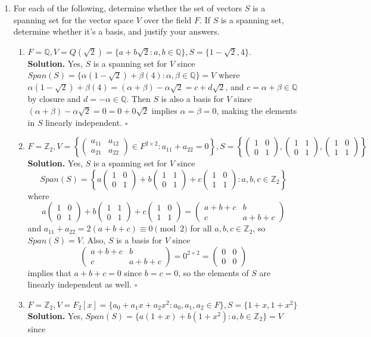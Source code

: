 \documentclass[11pt,twoside]{article}
\newcommand{\Z}{\mathbb{Z}}
\newcommand{\Q}{\mathbb{Q}}
\newcommand{\m}[1]{\begin{pmatrix}#1\end{pmatrix}}
\begin{document}
\begin{enumerate}
    \item For each of the following, determine whether the set of vectors $S$ is a spanning set for the vector space $V$ over the field $F$. If $S$ is a spanning set, determine whether it's a basis, and justify your answers.
          \begin{enumerate}
              \item $F=\Q,V=Q(\sqrt{2})=\{a+b\sqrt{2}: a,b\in\Q\},S=\{1-\sqrt{2},4\}$. \\
                    \textbf{Solution.} Yes, $S$ is a spanning set for $V$ since $Span(S)=\{\alpha(1-\sqrt{2}) + \beta(4):\alpha,\beta\in\Q\}=V$ where $\alpha(1-\sqrt{2})+\beta(4)=(\alpha+\beta)-\alpha\sqrt{2}=c+d\sqrt{2}$, and $c=\alpha+\beta\in\Q$ by closure and $d=-\alpha\in\Q$. Then $S$ is also a basis for $V$ since $(\alpha+\beta)-\alpha\sqrt{2}=0=0+0\sqrt{2}$ implies $\alpha=\beta=0$, making the elements in $S$ linearly independent. $\square$
              \item $F=\Z_2,V=\left\{\m{a_{11} & a_{12} \\ a_{21} & a_{22}}\in F^{2\times2}:a_{11}+a_{22}=0\right\}, S=\left\{\m{1&0\\0&1}, \m{1&1\\0&1}, \m{1&0\\1&1}\right\}$ \\
                    \textbf{Solution.} Yes, $S$ is a spanning set for $V$ since
                    \[Span(S)=\left\{a\m{1&0\\0&1}+b\m{1&1\\0&1}+c\m{1&0\\1&1}: a,b,c\in\Z_2\right\}\]
                    where
                    \[a\m{1&0\\0&1}+b\m{1&1\\0&1}+c\m{1&0\\1&1}=\m{a+b+c&b\\c&a+b+c}\]
                    and $a_{11}+a_{22}=2(a+b+c)\equiv 0\pmod{2}$ for all $a,b,c\in\Z_2$, so $Span(S)= V$. Also, $S$ is a basis for $V$ since
                    \[\m{a+b+c&b\\c&a+b+c}=0^{2\times 2}=\m{0&0\\0&0}\]implies that $a+b+c=0$ since $b=c=0$, so the elements of $S$ are linearly independent as well. $\square$
              \item $F=\Z_2,V=F_2[x]=\{a_0+a_1x+a_2x^2:a_0,a_1,a_2\in F\},S=\{1+x, 1+x^2\}$ \\
                    \textbf{Solution.} Yes, $Span(S)=\{a(1+x)+b(1+x^2):a,b\in \Z_2\}=V$ since

\end{enumerate}
\end{enumerate}
\end{document}
